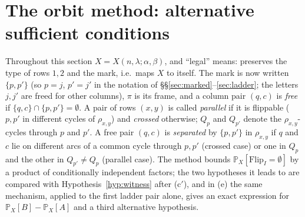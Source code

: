 \documentclass[11pt]{article}
\theoremstyle{definition}
\renewcommand{\Pr}{\mathbb{P}}
\begin{document}
\section{The orbit method: alternative sufficient conditions}\label{sec:orbit}

Throughout this section $X=X(n,\lambda;\alpha,\beta)$, and ``legal'' means: preserves the
type of rows $1,2$ and the mark, i.e.\ maps $X$ to itself.  The mark is now written
$\{p,p'\}$ (so $p=j$, $p'=j'$ in the notation of \S\S\ref{sec:marked}--\ref{sec:ladder}; the
letters $j,j'$ are freed for other columns), $\pi$ is its frame, and a column pair $(q,c)$ is
\emph{free} if $\{q,c\}\cap\{p,p'\}=\emptyset$.  A pair of rows $(x,y)$ is called
\emph{parallel} if it is flippable ($p,p'$ in different cycles of $\rho_{x,y}$) and
\emph{crossed} otherwise; $Q_p$ and $Q_{p'}$ denote the $\rho_{x,y}$-cycles through $p$ and
$p'$.  A free pair $(q,c)$ is \emph{separated} by $\{p,p'\}$ in $\rho_{x,y}$ if $q$ and $c$
lie on different arcs of a common cycle through $p,p'$ (crossed case) or one in $Q_p$ and the
other in $Q_{p'}\ne Q_p$ (parallel case).  The method bounds
$\Pr_X[\mathrm{Flip}_I=\emptyset]$ by a product of conditionally independent factors; the
two hypotheses it leads to are compared with Hypothesis~\ref{hyp:witness} after (c$'$), and
in (e) the same mechanism, applied to the first ladder pair alone, gives an exact expression
for $\Pr_X[B]-\Pr_X[A]$ and a third alternative hypothesis.
\end{document}

